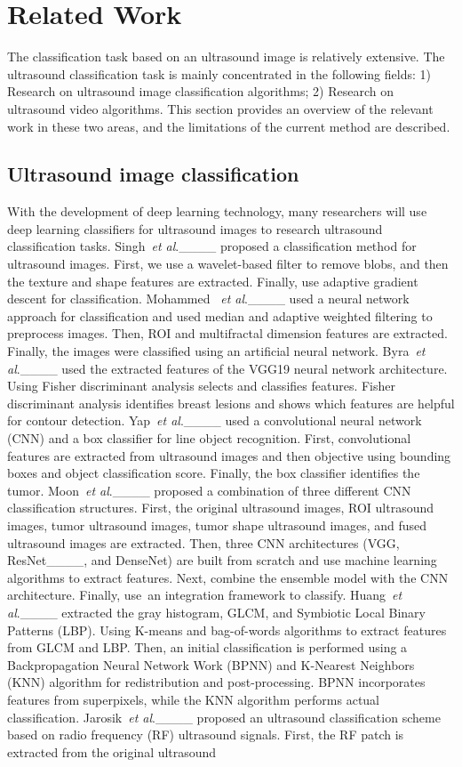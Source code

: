 \section{Related Work}
\label{sec:Related Work}
The classification task based on an ultrasound image is relatively extensive. The ultrasound classification task is mainly concentrated in the following fields: 1) Research on ultrasound image classification algorithms; 2) Research on ultrasound video algorithms. This section provides an overview of the relevant work in these two areas, and the limitations of the current method are described. 

\subsection{Ultrasound image classification}
With the development of deep learning technology, many researchers will use deep learning classifiers for ultrasound images to research ultrasound classification tasks. Singh~\emph{et al}.____ proposed a classification method for ultrasound images. First, we use a wavelet-based filter to remove blobs, and then the texture and shape features are extracted. Finally, use adaptive gradient descent for classification. Mohammed ~\emph{et al}.____ used a neural network approach for classification and used median and adaptive weighted filtering to preprocess images. Then, ROI and multifractal dimension features are extracted. Finally, the images were classified using an artificial neural network. Byra~\emph{et al}.____ used the extracted features of the VGG19 neural network architecture. Using Fisher discriminant analysis selects and classifies features. Fisher discriminant analysis identifies breast lesions and shows which features are helpful for contour detection. Yap~\emph{et al}.____ used a convolutional neural network (CNN) and a box classifier for line object recognition. First, convolutional features are extracted from ultrasound images and then objective using bounding boxes and object classification score. Finally, the box classifier identifies the tumor. Moon~\emph{et al}.____ proposed a combination of three different CNN classification structures. First, the original ultrasound images, ROI ultrasound images, tumor ultrasound images, tumor shape ultrasound images, and fused ultrasound images are extracted. Then, three CNN architectures (VGG, ResNet____, and DenseNet) are built from scratch and use machine learning algorithms to extract features. Next, combine the ensemble model with the CNN architecture. Finally, use an integration framework to classify. Huang~\emph{et al}.____ extracted the gray histogram, GLCM, and Symbiotic Local Binary Patterns (LBP). Using K-means and bag-of-words algorithms to extract features from GLCM and LBP. Then, an initial classification is performed using a Backpropagation Neural Network Work (BPNN) and K-Nearest Neighbors (KNN) algorithm for redistribution and post-processing. BPNN incorporates features from superpixels, while the KNN algorithm performs actual classification. Jarosik~\emph{et al}.____ proposed an ultrasound classification scheme based on radio frequency (RF) ultrasound signals. First, the RF patch is extracted from the original ultrasound 